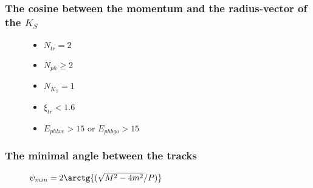 \documentclass[14pt, hyperref = {colorlinks}]{beamer}
\begin{document}
\begin{frame}
\frametitle{The cosine between the momentum and the radius-vector of the $K_{S}$}
\begin{figure}[h]
\begin{minipage}[h]{0.69\linewidth}
\end{minipage}
\begin{minipage}[h]{0.29\linewidth}
    \begin{itemize}
        \item {$N_{tr} = 2$}
        \item {$N_{ph} \geq 2$}
        \item {$N_{K_{S}} = 1$}
        \item {$\xi_{tr} < 1.6$}
        \item {$E_{phlxe} > 15$ or $E_{phbgo} > 15$}
    \end{itemize}
\end{minipage}
\hfill
\end{figure}
\end{frame}

\begin{frame}\label{r1}
\frametitle{The minimal angle between the tracks}
\begin{figure}[h]
    \center\textbf{$\psi_{min} = 2\arctg{(\sqrt{M^{2} - 4m^{2}}/P)}$}\\
\begin{minipage}[h]{0.49\linewidth}   
\end{minipage}
\begin{minipage}[h]{0.49\linewidth}
    \begin{itemize}
    \end{itemize}
\end{minipage}
\hfill
\end{figure}
\end{frame}
\end{document}
